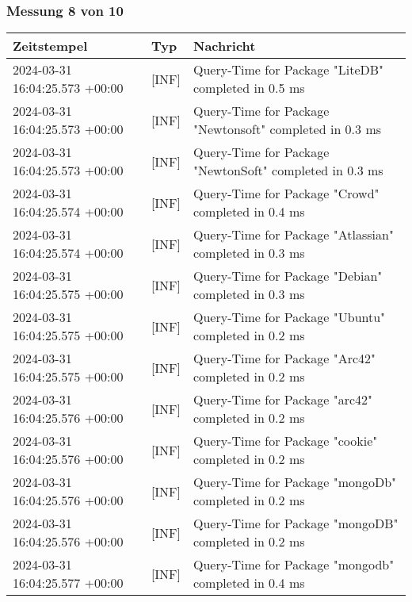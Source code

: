    \subsubsection*{Messung 8 von 10} \label{subsubsec:MySQLMitIndex8von10}
        {
            {\small
                \begin{tabularx}{\textwidth}{|l|l|X|}
                    \hline
                    \textbf{Zeitstempel} & \textbf{Typ} & \textbf{Nachricht} \\
                    \hline
                    \endhead
                    2024-03-31 16:04:25.573 +00:00 & [INF] & Query-Time for Package "LiteDB" completed in 0.5 ms \\
                    2024-03-31 16:04:25.573 +00:00 & [INF] & Query-Time for Package "Newtonsoft" completed in 0.3 ms \\
                    2024-03-31 16:04:25.573 +00:00 & [INF] & Query-Time for Package "NewtonSoft" completed in 0.3 ms \\
                    2024-03-31 16:04:25.574 +00:00 & [INF] & Query-Time for Package "Crowd" completed in 0.4 ms \\
                    2024-03-31 16:04:25.574 +00:00 & [INF] & Query-Time for Package "Atlassian" completed in 0.3 ms \\
                    2024-03-31 16:04:25.575 +00:00 & [INF] & Query-Time for Package "Debian" completed in 0.3 ms \\
                    2024-03-31 16:04:25.575 +00:00 & [INF] & Query-Time for Package "Ubuntu" completed in 0.2 ms \\
                    2024-03-31 16:04:25.575 +00:00 & [INF] & Query-Time for Package "Arc42" completed in 0.2 ms \\
                    2024-03-31 16:04:25.576 +00:00 & [INF] & Query-Time for Package "arc42" completed in 0.2 ms \\
                    2024-03-31 16:04:25.576 +00:00 & [INF] & Query-Time for Package "cookie" completed in 0.2 ms \\
                    2024-03-31 16:04:25.576 +00:00 & [INF] & Query-Time for Package "mongoDb" completed in 0.2 ms \\
                    2024-03-31 16:04:25.576 +00:00 & [INF] & Query-Time for Package "mongoDB" completed in 0.2 ms \\
                    2024-03-31 16:04:25.577 +00:00 & [INF] & Query-Time for Package "mongodb" completed in 0.4 ms \\

\end{tabularx}}}
